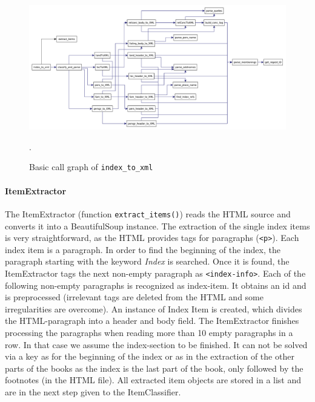 \begin{figure}[h]
  \centering
  \includegraphics[scale=0.35]{img/index-to-xml}
  \caption{Basic call graph of \texttt{index\_to\_xml}}.
  \label{fig:index-to-xml}
\end{figure}

\paragraph{ItemExtractor}
The ItemExtractor (function \texttt{extract\_items()}) reads the HTML source and converts it into a BeautifulSoup instance. The extraction of the single index items is very straightforward, as the HTML provides tags for paragraphs (\texttt{<p>}). Each index item is a paragraph. In order to find the beginning of the index, the paragraph starting with the keyword \textit{Index} is searched. Once it is found, the ItemExtractor tags the next non-empty paragraph as \texttt{<index-info>}. Each of the following non-empty paragraphs is recognized as index-item. It obtains an id and is preprocessed (irrelevant tags are deleted from the HTML and some irregularities are overcome). An instance of Index Item is created, which divides the HTML-paragraph into a header and body field. The ItemExtractor finishes processing the paragraphs when reading more than 10 empty paragraphs in a row. In that case we assume the index-section to be finished. It can not be solved via a key as for the beginning of the index or as in the extraction of the other parts of the books as the index is the last part of the book, only followed by the footnotes (in the HTML file). All extracted item objects are stored in a list and are in the next step given to the ItemClassifier.

